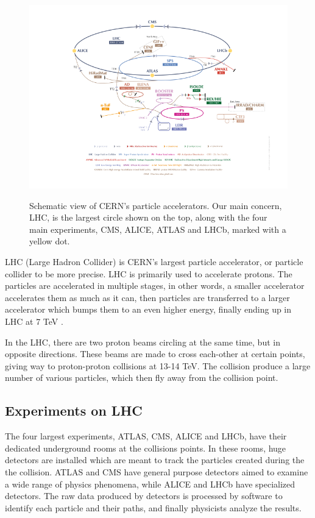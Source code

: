\documentclass[12pt]{article}
\begin{document}
	\begin{figure}[H]
		\includegraphics[width=\textwidth]{accelerator_complex}
		\label{fig_accel_complex}
		\caption{Schematic view of CERN's particle accelerators. Our main concern, LHC, is the largest circle shown on the top, along with the four main experiments, CMS, ALICE, ATLAS and LHCb, marked with a yellow dot.}
	\end{figure}
	
	LHC (Large Hadron Collider) is CERN's largest particle accelerator, or particle collider to be more precise. LHC is primarily used to accelerate protons. The particles are accelerated in multiple stages, in other words, a smaller accelerator accelerates them as much as it can, then particles are transferred to a larger accelerator which bumps them to an even higher energy, finally ending up in LHC at 7 TeV \cite{lhc_energy}.
	
	In the LHC, there are two proton beams circling at the same time, but in opposite directions. These beams are made to cross each-other at certain points, giving way to proton-proton collisions at 13-14 TeV. The collision produce a large number of various particles, which then fly away from the collision point.
	
	
	\subsection{Experiments on LHC}
	
	The four largest experiments, ATLAS, CMS, ALICE and LHCb, have their dedicated underground rooms at the collisions points. In these rooms, huge detectors are installed which are meant to track the particles created during the the collision. ATLAS and CMS have general purpose detectors aimed to examine a wide range of physics phenomena, while ALICE and LHCb have specialized detectors. The raw data produced by detectors is processed by software to identify each particle and their paths, and finally physicists analyze the results.
	
\end{document}
